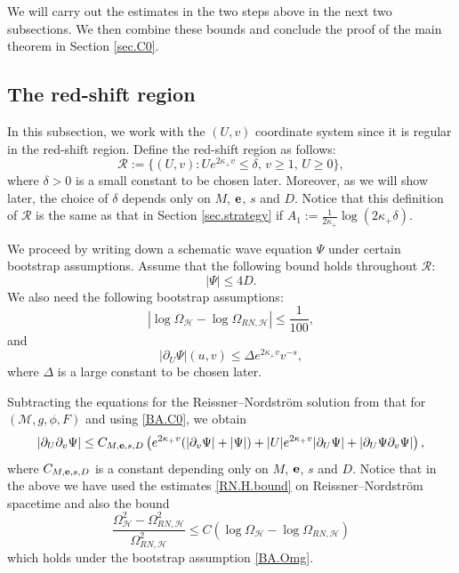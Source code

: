 \documentclass[10pt, reqno]{amsart}
\theoremstyle{definition}
\theoremstyle{remark}
\numberwithin{equation}{section}
\newcommand{\rd}{\partial}
\newcommand{\0}{\emptyset}
\newcommand{\Omg}{\Omega}
\newcommand{\f}{\frac}
\newcommand{\de}{\delta}
\begin{document}
We will carry out the estimates in the two steps above in the next two subsections. We then combine these bounds and conclude the proof of the main theorem in Section \ref{sec.C0}.

\subsection{The red-shift region}\label{sec.RS}

In this subsection, we work with the $(U,v)$ coordinate system since it is regular in the red-shift region. Define the red-shift region as follows:
$$\mathcal R:=\{(U,v): U e^{2 \kappa_+ v}\leq \de, \,v\geq 1,\, U\geq 0\},$$
where $\de>0$ is a small constant to be chosen later. Moreover, as we will show later, the choice of $\de$ depends only on $M$, ${\bf e}$, $s$ and $D$. Notice that this definition of $\mathcal R$ is the same as that in Section \ref{sec.strategy} if $A_1:=\f{1}{2\kappa_+}\log (2\kappa_+\de)$.

We proceed by writing down a schematic wave equation $\Psi$ under certain bootstrap assumptions. Assume that the following bound holds throughout $\mathcal R$:
\begin{equation}\label{BA.C0}
|\Psi|\leq 4D.
\end{equation}
We also need the following bootstrap assumptions:
\begin{equation}\label{BA.Omg}
|\log\Omg_{\mathcal H}-\log \Omg_{RN,\mathcal H}|\leq \f 1{100},
\end{equation}
and
\begin{equation}\label{BA.RS}
|\rd_U\Psi|(u,v)\leq \Delta e^{2\kappa_+ v}v^{-s},
\end{equation}
where $\Delta$ is a large constant to be chosen later.

Subtracting the equations for the Reissner--Nordstr\"om solution from that for $(\mathcal M,g,\phi,F)$ and using \eqref{BA.C0}, we obtain
\begin{equation}\label{RS.eqn}
|\rd_U\rd_v\Psi|\leq C_{M,{\bf e},s,D}\left( e^{2\kappa_+ v}(|\rd_v\Psi|+|\Psi|)+ |U|e^{2\kappa_+ v} |\rd_U\Psi|+|\rd_U\Psi\rd_v\Psi|\right),
\end{equation}
where $C_{M,{\bf e},s,D}$ is a constant depending only on $M$, ${\bf e}$, $s$ and $D$. Notice that in the above we have used the estimates \eqref{RN.H.bound} on Reissner--Nordstr\"om spacetime and also the bound
\begin{equation}\label{Omg.diff.bound}
\f{\Omg^2_{\mathcal H}-\Omg^2_{RN,\mathcal H}}{\Omg^2_{RN,\mathcal H}}\leq C\left(\log\Omg_{\mathcal H}-\log\Omg_{RN,\mathcal H}\right)
\end{equation}
which holds under the bootstrap assumption \eqref{BA.Omg}.
\end{document}
